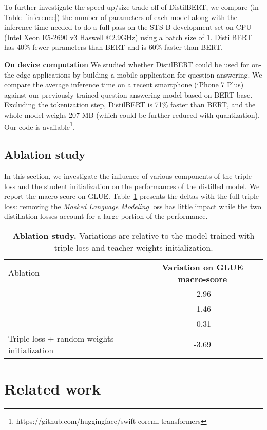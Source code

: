 \documentclass{article}
\begin{document}
To further investigate the speed-up/size trade-off of DistilBERT, we compare (in Table~\ref{inference}) the number of parameters of each model along with the inference time needed to do a full pass on the STS-B development set on CPU (Intel Xeon E5-2690 v3 Haswell @2.9GHz) using a batch size of 1. DistilBERT has 40\% fewer parameters than BERT and is 60\% faster than BERT.


\textbf{On device computation}
We studied whether DistilBERT could be used for on-the-edge applications by building a mobile application for question answering. We compare the average inference time on a recent smartphone (iPhone 7 Plus) against our previously trained question answering model based on BERT-base. Excluding the tokenization step, DistilBERT is 71\% faster than BERT, and the whole model weighs 207 MB (which could be further reduced with quantization). Our code is available\footnote{https://github.com/huggingface/swift-coreml-transformers}.


\subsection{Ablation study}

In this section, we investigate the influence of various components of the triple loss and the student initialization on the performances of the distilled model. We report the macro-score on GLUE. Table~\ref{ablation} presents the deltas with the full triple loss: removing the \textit{Masked Language Modeling} loss has little impact while the two distillation losses account for a large portion of the performance.

\begin{table}
  \caption{\textbf{Ablation study.} Variations are relative to the model trained with triple loss and teacher weights initialization.}
  \label{ablation}
  \centering
  \begin{tabular}{lc}
    \toprule
    Ablation & \textbf{Variation on GLUE macro-score}\\
    \cmidrule(r){1-2}
     -  -  & -2.96\\
     -  -  & -1.46\\
     -  -  & -0.31\\
    Triple loss + random weights initialization & -3.69\\
    \bottomrule
  \end{tabular}
\end{table}

\section{Related work}
\end{document}
